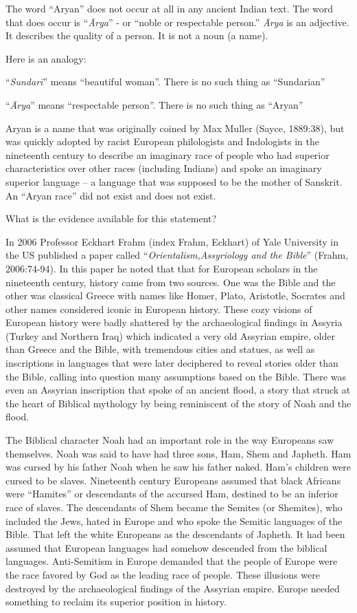 The word “Aryan” does not occur at all in any ancient Indian text. The word that does occur is “\textit{Ārya}” - or “noble or respectable person.” \textit{Ārya} is an adjective. It describes the quality of a person. It is not a noun (a name).

Here is an analogy:

“\textit{Sundarī}” means “beautiful woman”. There is no such thing as “Sundarian”

“\textit{Ārya}” means “respectable person”. There is no such thing as “Aryan”

Aryan is a name that was originally coined by Max Muller (Sayce, 1889:38), but was quickly adopted by racist European philologists and Indologists in the nineteenth century to describe an imaginary race of people who had superior characteristics over other races (including Indians) and spoke an imaginary superior language – a language that was supposed to be the mother of Sanskrit. An “Aryan race” did not exist and does not exist.

What is the evidence available for this statement?

In 2006 Professor Eckhart Frahm (index Frahm, Eckhart) of Yale University in the US published a paper called “\textit{Orientalism,Assyriology and the Bible}” (Frahm, 2006:74-94). In this paper he noted that that for European scholars in the nineteenth century, history came from two sources. One was the Bible and the other was classical Greece with names like Homer, Plato, Aristotle, Socrates and other names considered iconic in European history. These cozy visions of European history were badly shattered by the archaeological findings in Assyria (Turkey and Northern Iraq) which indicated a very old Assyrian empire, older than Greece and the Bible, with tremendous cities and statues, as well as inscriptions in languages that were later deciphered to reveal stories older than the Bible, calling into question many assumptions based on the Bible. There was even an Assyrian inscription that spoke of an ancient flood, a story that struck at the heart of Biblical mythology by being reminiscent of the story of Noah and the flood.

The Biblical character Noah had an important role in the way Europeans saw themselves. Noah was said to have had three sons, Ham, Shem and Japheth. Ham was cursed by his father Noah when he saw his father naked. Ham’s children were cursed to be slaves. Nineteenth century Europeans assumed that black Africans were “Hamites” or descendants of the accursed Ham, destined to be an inferior race of slaves. The descendants of Shem became the Semites (or Shemites), who included the Jews, hated in Europe and who spoke the Semitic languages of the Bible. That left the white Europeans as the descendants of Japheth. It had been assumed that European languages had somehow descended from the biblical languages. Anti-Semitism in Europe demanded that the people of Europe were the race favored by God as the leading race of people. These illusions were destroyed by the archaeological findings of the Assyrian empire. Europe needed something to reclaim its superior position in history.

